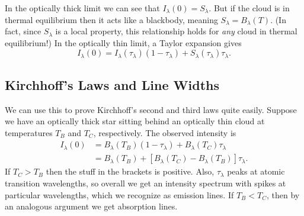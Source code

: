 \documentclass[../a062main.tex]{subfiles}
\begin{document}
In the optically thick limit we can see that $I_\lambda(0) = S_\lambda$.
But if the cloud is in thermal equilibrium then it acts like a blackbody, meaning $S_\lambda = B_\lambda(T)$.
(In fact, since $S_\lambda$ is a local property, this relationship holds for \textit{any} cloud in thermal equilibrium!)
In the optically thin limit, a Taylor expansion gives
\[ I_\lambda(0) = I_\lambda(\tau_\lambda) (1-\tau_\lambda) + S_\lambda(\tau_\lambda) \tau_\lambda. \]

\subsection*{Kirchhoff's Laws and Line Widths}
We can use this to prove Kirchhoff's second and third laws quite easily.
Suppose we have an optically thick star sitting behind an optically thin cloud at temperatures $T_B$ and $T_C$, respectively.
The observed intensity is
\begin{align*}
    I_\lambda(0) &= B_\lambda(T_B)(1-\tau_\lambda) + B_\lambda(T_C)\tau_\lambda \\
    &= B_\lambda(T_B) + [B_\lambda (T_C)- B_\lambda(T_B)] \tau_\lambda.
\end{align*}
If $T_C > T_B$ then the stuff in the brackets is positive.
Also, $\tau_\lambda$ peaks at atomic transition wavelengths, so overall we get an intensity spectrum with spikes at particular wavelengths, which we recognize as emission lines.
If $T_B < T_C$, then by an analogous argument we get absorption lines.
\end{document}
